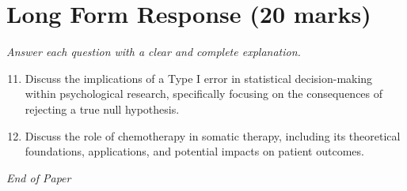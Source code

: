 \documentclass[12pt]{article}
\begin{document}
\section*{Long Form Response (20 marks)}
\textit{Answer each question with a clear and complete explanation.}
\begin{enumerate}[label=\arabic*.]
\setcounter{enumi}{10}
\item Discuss the implications of a Type I error in statistical decision-making within psychological research, specifically focusing on the consequences of rejecting a true null hypothesis.
\item Discuss the role of chemotherapy in somatic therapy, including its theoretical foundations, applications, and potential impacts on patient outcomes.
\end{enumerate}

\vfill
\noindent\textit{End of Paper}
\end{document}
